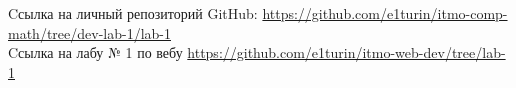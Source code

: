 \begin{thebibliography}{}
 Cсылка на личный репозиторий GitHub: \url{https://github.com/e1turin/itmo-comp-math/tree/dev-lab-1/lab-1}\\

 Cсылка на лабу № 1 по вебу \url{https://github.com/e1turin/itmo-web-dev/tree/lab-1}\\
\end{thebibliography}